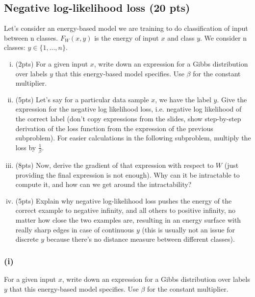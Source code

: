 \subsection{Negative log-likelihood loss (20 pts) }

Let's consider an energy-based model we are training to do classification of input between n classes. $F_W(x, y)$ is the energy of input $x$ and class $y$. We consider n classes: $y \in \{1, \dots, n\}$.

\begin{enumerate}[(i)]
    \item (2pts) For a given input $x$, write down an expression for a Gibbs distribution over labels $y$ that this energy-based model specifies. Use $\beta$ for the constant multiplier.

    \item (5pts) Let's say for a particular data sample $x$, we have the label $y$. Give the expression for the negative log likelihood loss, i.e. negative log likelihood of the correct label (don't copy expressions from the slides, show step-by-step derivation of the loss function from the expression of the previous subproblem). For easier calculations in the following subproblem, multiply the loss by $\frac{1}{\beta}$.

    \item (8pts) Now, derive the gradient of that expression with respect to $W$ (just providing the final expression is not enough). Why can it be intractable to compute it, and how can we get around the intractability?

    \item (5pts) Explain why negative log-likelihood loss pushes the energy of the correct example to negative infinity, and all others to positive infinity, no matter how close the two examples are, resulting in an energy surface with really sharp edges in case of continuous $y$ (this is usually not an issue for discrete $y$ because there's no distance measure between different classes).

\end{enumerate}

\subsubsection*{(i)}
For a given input $x$, write down an expression for a Gibbs distribution over labels $y$ that this energy-based model specifies. Use $\beta$ for the constant multiplier.


